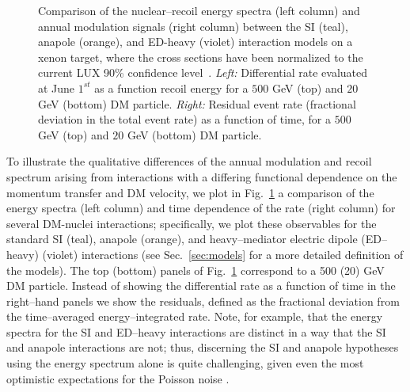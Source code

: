 \documentclass[11pt]{article}
\newcommand{\Sec}[1]{Sec.~\ref{#1}} \newcommand{\Secs}[2]{Secs.~\ref{#1} and \ref{#2}} \newcommand{\Secm}[2]{Secs.~\ref{#1} through \ref{#2}}
\newcommand{\Fig}[1]{Fig.~\ref{#1}} \newcommand{\Figs}[2]{Figs.~\ref{#1} and \ref{#2}}
\begin{document}
\begin{figure}
\caption{\label{fig:diff_rate_comp}
Comparison of the nuclear--recoil energy spectra (left column) and annual modulation signals (right column) between the SI (teal), anapole (orange), and ED-heavy (violet) interaction models on a xenon target, where the cross sections have been normalized to the current LUX 90\% confidence level~\cite{Akerib:2016vxi}. \emph{Left:} Differential rate evaluated at June $1^{st}$ as a function recoil energy for a $500$ GeV (top) and $20$ GeV (bottom) DM particle. \emph{Right:} Residual event rate (fractional deviation in the total event rate) as a function of time, for a $500$ GeV (top) and $20$ GeV (bottom) DM particle. }
\end{figure}
To illustrate the qualitative differences of the annual modulation and recoil spectrum arising from interactions with a differing functional dependence on the momentum transfer and DM velocity, we plot in \Fig{fig:diff_rate_comp} a comparison of the energy spectra (left column) and time dependence of the rate (right column) for several DM-nuclei interactions; specifically, we plot these observables for the standard SI (teal), anapole (orange), and heavy--mediator electric dipole (ED--heavy) (violet) interactions (see \Sec{sec:models} for a more detailed definition of the models). The top (bottom) panels of \Fig{fig:diff_rate_comp} correspond to a 500 (20) GeV DM particle.  Instead of showing the differential rate as a function of time in the right--hand panels we show the residuals, defined as the fractional deviation from the time--averaged energy--integrated rate. Note, for example, that the energy spectra for the SI and ED--heavy interactions are distinct in a way that the SI and anapole interactions are not; thus, discerning the SI and anapole hypotheses using the energy spectrum alone is quite challenging, given even the most optimistic expectations for the Poisson noise \cite{Gluscevic:2015sqa}. 
\end{document}

